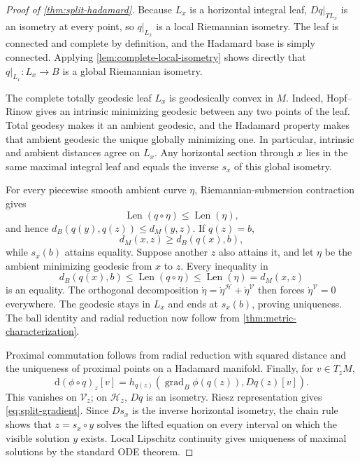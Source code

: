\documentclass[10pt]{article}
\theoremstyle{plain}
\theoremstyle{definition}
\theoremstyle{remark}
\newcommand{\dd}{\mathrm d}
\begin{document}
\begin{proof}[Proof of \cref{thm:split-hadamard}]
Because \(L_x\) is a horizontal integral leaf,
\(Dq|_{TL_x}\) is an isometry at every point, so \(q|_{L_x}\) is a local
Riemannian isometry.  The leaf is connected and complete by definition, and
the Hadamard base is simply connected.  Applying
\cref{lem:complete-local-isometry} shows directly that
\(q|_{L_x}:L_x\to B\) is a global Riemannian isometry.

The complete totally geodesic leaf \(L_x\) is geodesically convex in \(M\).
Indeed, Hopf--Rinow gives an intrinsic minimizing geodesic between any two
points of the leaf.  Total geodesy makes it an ambient geodesic, and the
Hadamard property makes that ambient geodesic the unique globally minimizing
one.  In particular, intrinsic and ambient distances agree on \(L_x\).
Any horizontal section through \(x\) lies in the same maximal integral leaf
and equals the inverse \(s_x\) of this global isometry.

For every piecewise smooth ambient curve \(\eta\), Riemannian-submersion
contraction gives
\[
  \operatorname{Len}(q\circ\eta)\le\operatorname{Len}(\eta),
\]
and hence \(d_B(q(y),q(z))\le d_M(y,z)\).  If \(q(z)=b\),
\[
  d_M(x,z)\ge d_B(q(x),b),
\]
while \(s_x(b)\) attains equality.  Suppose another \(z\) also attains it,
and let \(\eta\) be the ambient minimizing geodesic from \(x\) to \(z\).
Every inequality in
\[
  d_B(q(x),b)
  \le\operatorname{Len}(q\circ\eta)
  \le\operatorname{Len}(\eta)
  =d_M(x,z)
\]
is an equality.  The orthogonal decomposition
\(\dot\eta=\dot\eta^{\mathcal H}+\dot\eta^{\mathcal V}\) then forces
\(\dot\eta^{\mathcal V}=0\) everywhere.  The geodesic stays in \(L_x\) and
ends at \(s_x(b)\), proving uniqueness.  The ball identity and radial
reduction now follow from \cref{thm:metric-characterization}.

Proximal commutation follows from radial reduction with squared distance and
the uniqueness of proximal points on a Hadamard manifold.  Finally, for
\(v\in T_zM\),
\[
  \dd(\phi\circ q)_z[v]
  =h_{q(z)}(\operatorname{grad}_B\phi(q(z)),Dq(z)[v]).
\]
This vanishes on \(\mathcal V_z\); on \(\mathcal H_z\), \(Dq\) is an
isometry.  Riesz representation gives \eqref{eq:split-gradient}.  Since
\(Ds_x\) is the inverse horizontal isometry, the chain rule shows that
\(z=s_x\circ y\) solves the lifted equation on every interval on which the
visible solution \(y\) exists.  Local Lipschitz continuity gives uniqueness
of maximal solutions by the standard ODE theorem.
\end{proof}
\end{document}
